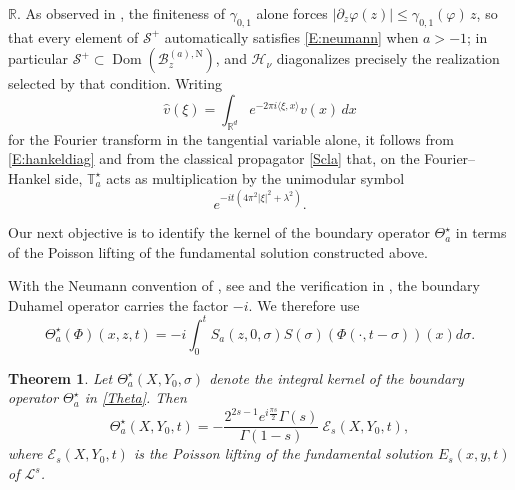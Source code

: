 \documentclass[11pt,letter]{amsart}
\def \R {\mathbb{R}}
\def \G{\Gamma}
\newcommand{\BaN}{\mathscr B_z^{(a),\mathrm N}}
\def \vf{\varphi}
\newcommand{\Rd}{\mathbb R^d}
\newcommand{\p}{\partial}
\numberwithin{equation}{section}
\newcommand{\sa}{\langle}
\newcommand{\da}{\rangle}
\newcommand{\Le}{\mathcal L}
\newcommand{\Dom}{\operatorname{Dom}}
\newtheorem{theorem}{Theorem}[section]
\numberwithin{equation}{section}
\begin{document}
$\R$. As observed in \cite{GS1}, the finiteness of $\gamma_{0,1}$ alone forces
$|\p_z\vf(z)|\le\gamma_{0,1}(\vf)\,z$, so that every element of $\mathscr S^+$
automatically satisfies \eqref{E:neumann} when $a>-1$; in particular
$\mathscr S^+\subset\Dom(\BaN)$, and $\mathcal H_\nu$ diagonalizes precisely
the realization selected by that condition. Writing
\[
\widehat{v}(\xi) = \int_{\Rd} e^{-2\pi i \sa \xi,x\da} v(x)\, dx
\]
for the Fourier transform in the tangential variable alone, it follows from \eqref{E:hankeldiag} and from the classical propagator \eqref{Scla} that, on the Fourier--Hankel side, $\mathbb T^\star_a$ acts as multiplication by the unimodular symbol
\begin{equation}\label{E:multiplier}
e^{-i t\left(4\pi^2|\xi|^2+\lambda^2\right)} .
\end{equation}

Our next objective is to identify the kernel of the boundary operator $\Theta_a^\star$ in terms of the Poisson lifting of the fundamental solution constructed above.

With the Neumann convention of \cite{GS2}, see \cite[(2.5)]{GS2} and the verification in \cite[Remark~2.1]{GS2}, the boundary Duhamel operator carries the factor $-i$. We therefore use
\begin{equation}\label{Theta}
\Theta_a^\star(\Phi)(x,z,t) = -i \int_0^{t} S_a(z,0,\sigma) S(\sigma)(\Phi(\cdot,t-\sigma))(x)  d\sigma.
\end{equation}

\begin{theorem}\label{T:id}
Let $\Theta^\star_a(X,Y_0,\sigma)$ denote the integral kernel of the boundary operator $\Theta_a^\star$ in \eqref{Theta}. Then 
\[
\Theta^\star_a(X,Y_0,t) = -\frac{2^{2s-1}e^{i\frac{\pi s}2}\G(s)}{\G(1-s)}\ \mathscr E_s(X,Y_0,t),
\]
where $\mathscr E_s(X,Y_0,t)$ is the Poisson lifting of the fundamental solution $ E_s(x,y,t)$ of $\Le^s$.
\end{theorem}
\end{document}
